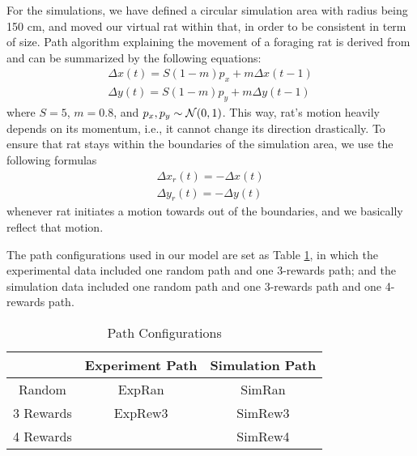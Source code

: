\documentclass[11pt, letterpaper, onecolumn]{article}
\newcommand{\Nc}{{\cal N}}
\begin{document}
For the simulations, we have defined a circular simulation area with radius being 150 cm, and moved our virtual rat within that, in order to be consistent in term of size. Path algorithm explaining the movement of a foraging rat is derived from \cite{Hasselmo:Grid07} and can be summarized by the following equations:
\begin{equation}
\label{eq:simple}
\begin{array}{cc}
\Delta x(t) = S(1-m)p_{x} + m\Delta x(t-1)\\
\Delta y(t) = S(1-m)p_{y} + m\Delta y(t-1)
\end{array}
\end{equation}
where $ S = 5 $, $ m = 0.8 $, and $ p_{x}, p_{y} \sim \Nc(0,1) $. This  way, rat's motion heavily depends on its momentum, i.e., it cannot change its direction drastically. To ensure that rat stays within  the boundaries of the simulation area, we use the following formulas
\begin{equation}
\begin{array}{cc}
\Delta x_{r}(t) = - \Delta x(t)\\
\Delta y_{r}(t) = - \Delta y(t)
\end{array}
\end{equation}
whenever rat initiates a motion towards out of the boundaries, and we basically reflect that motion. 

The path configurations used in our model are set as Table \ref{lb:path}, in which the experimental data included one random path and one 3-rewards path; and the simulation data included one random path and one 3-rewards path and one 4-rewards path.
\begin{table}[h]
\centering
\caption{Path Configurations}
\label{lb:path}
\begin{tabular}{c|c|c}
\hline
        & Experiment Path & Simulation Path \\ \hline
        Random & ExpRan & SimRan \\ \hline
        3 Rewards & ExpRew3 & SimRew3 \\ \hline
        4 Rewards & & SimRew4   \\ \hline
\end{tabular}
\end{table}
\end{document}

